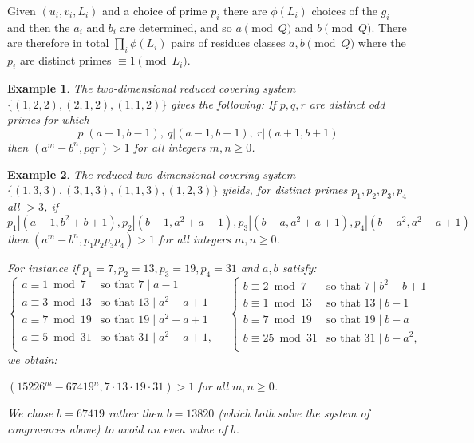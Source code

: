 \documentclass[12pt, a4paper,  reqno, english]{amsart}%
\numberwithin{equation}{section}
\newtheorem{example}{Example}
\theoremstyle{definition}
\renewcommand{\geq}{\geqslant}
\begin{document}
Given $(u_i,v_i,L_i)$ and a choice of prime $p_i$ there are $\phi(L_i)$ choices of the $g_i$ and then the $a_i$ and $b_i$ are determined, and so $a \pmod Q$ and $b\pmod Q$.  There are therefore  in total
   $\prod_i \phi(L_i)$ pairs of residues classes $a,b \pmod Q$ where  the $p_i$ are distinct primes $\equiv 1 \pmod {L_i}$.

     
\begin{example} The  two-dimensional reduced covering system $\{ (1,2,2), (2,1,2), (1,1,2)\}$ gives the following:
If $p,q,r$ are distinct odd primes for which 
 \[
 p|(a+1,b-1),\ q|(a-1,b+1),\ r|(a+1,b+1)
 \]
then $(a^m-b^n,pqr)>1$ for all integers $m,n\geq 0$.
\end{example}

 

\begin{example} The reduced two-dimensional covering system  $\{ (1,3,3), (3,1,3), (1,1,3), (1,2,3)\}$ yields, for distinct  primes $p_1,p_2,p_3,p_4$ all $>3$, if
\[
p_1|(a-1,b^2+b+1), p_2|(b-1,a^2+a+1), p_3|(b-a,a^2+a+1),  p_4|(b-a^2,a^2+a+1)
\]
then $(a^m-b^n,p_1p_2p_3p_4)>1$ for all integers $m,n\geq 0$.\smallskip

For instance if $p_1=7, p_2=13, p_3=19, p_4=31$ and $a, b$ satisfy:
$$\begin{cases}a\equiv 1\bmod 7 & \text{so that }7\mid a-1\\
a\equiv 3\bmod 13& \text{so that }13\mid a^2-a+1\\
a\equiv 7\bmod 19& \text{so that }19\mid a^2+a+1\\
a\equiv 5\bmod 31 & \text{so that }31\mid a^2+a+1,\\
\end{cases}
\quad
\begin{cases}b\equiv 2\bmod 7 & \text{so that }7\mid b^2-b+1\\
b\equiv 1\bmod 13& \text{so that }13\mid b-1\\
b\equiv 7\bmod 19& \text{so that }19\mid b-a\\
b\equiv 25\bmod 31 & \text{so that }31\mid b-a^2,\\
\end{cases}$$
we obtain:

\centerline{$(15226^m-67419^n,7\cdot 13\cdot 19\cdot 31)>1$ for all $m,n\geq 0$.}

\noindent We chose $b=67419$ rather then $b=13820$ (which both solve the system of congruences above) to avoid an even value of $b$.  
\end{example}
 
\end{document}
